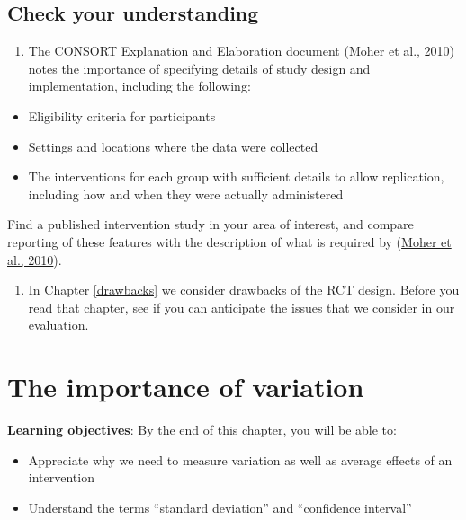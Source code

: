 \documentclass{krantz}
\providecommand{\tightlist}{%
\setlength{\itemsep}{0pt}\setlength{\parskip}{0pt}}
\begin{document}
\hypertarget{check-your-understanding-9}{%
\section{Check your understanding}\label{check-your-understanding-9}}

\begin{enumerate}
\def\labelenumi{\arabic{enumi}.}
\tightlist
\item
  The CONSORT Explanation and Elaboration document (\protect\hyperlink{ref-moher2010}{Moher et al., 2010}) notes the importance of specifying details of study design and implementation, including the following:
\end{enumerate}

\begin{itemize}
\tightlist
\item
  Eligibility criteria for participants\\
\item
  Settings and locations where the data were collected
\item
  The interventions for each group with sufficient details to allow replication, including how and when they were actually administered
\end{itemize}

Find a published intervention study in your area of interest, and compare reporting of these features with the description of what is required by (\protect\hyperlink{ref-moher2010}{Moher et al., 2010}).

\begin{enumerate}
\def\labelenumi{\arabic{enumi}.}
\setcounter{enumi}{1}
\tightlist
\item
  In Chapter \ref{drawbacks} we consider drawbacks of the RCT design. Before you read that chapter, see if you can anticipate the issues that we consider in our evaluation.
\end{enumerate}

\hypertarget{variation}{%
\chapter{The importance of variation}\label{variation}}

\textbf{Learning objectives}: By the end of this chapter, you will be able to:

\begin{itemize}
\tightlist
\item
  Appreciate why we need to measure variation as well as average effects of an intervention\\
\item
  Understand the terms ``standard deviation'' and ``confidence interval''
\end{itemize}
\end{document}
